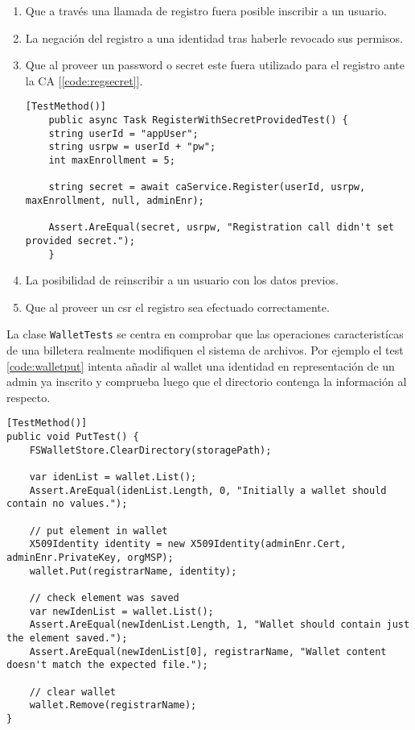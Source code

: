 \begin{enumerate}
	\item Que a trav\'es una llamada de registro fuera posible inscribir a un usuario.
	
	\item La negaci\'on del registro a una identidad tras haberle revocado sus permisos.
	
	\item Que al proveer un password o secret este fuera utilizado para el registro ante la CA [\ref{code:regsecret}].
	
	\begin{lstlisting}[caption={Test de la clase \texttt{CAServiceTests} para comprobar que el secret provisto se utilice en el registro.}, label={code:regsecret}]
	[TestMethod()]
	public async Task RegisterWithSecretProvidedTest() {
	string userId = "appUser";
	string usrpw = userId + "pw";
	int maxEnrollment = 5;
	
	string secret = await caService.Register(userId, usrpw, maxEnrollment, null, adminEnr);
	
	Assert.AreEqual(secret, usrpw, "Registration call didn't set provided secret.");
	}
	\end{lstlisting}
	
	\item La posibilidad de reinscribir a un usuario con los datos previos.
	
	\item Que al proveer un csr el registro sea efectuado correctamente.
\end{enumerate}

La clase \texttt{WalletTests} se centra en comprobar que las operaciones caracterist\'icas de una billetera realmente modifiquen el sistema de archivos. Por ejemplo el test \ref{code:walletput} intenta a\~nadir al wallet una identidad en representaci\'on de un admin ya inscrito y comprueba luego que el directorio contenga la informaci\'on al respecto.

\begin{lstlisting}[caption={Test para chequear el m\'etodo \texttt{Put} de la clase \texttt{Wallet}.}, label={code:walletput}]
[TestMethod()]
public void PutTest() {
	FSWalletStore.ClearDirectory(storagePath);

	var idenList = wallet.List();
	Assert.AreEqual(idenList.Length, 0, "Initially a wallet should contain no values.");

	// put element in wallet
	X509Identity identity = new X509Identity(adminEnr.Cert, adminEnr.PrivateKey, orgMSP);
	wallet.Put(registrarName, identity);

	// check element was saved
	var newIdenList = wallet.List();
	Assert.AreEqual(newIdenList.Length, 1, "Wallet should contain just the element saved.");
	Assert.AreEqual(newIdenList[0], registrarName, "Wallet content doesn't match the expected file.");

	// clear wallet
	wallet.Remove(registrarName);
}
\end{lstlisting}

